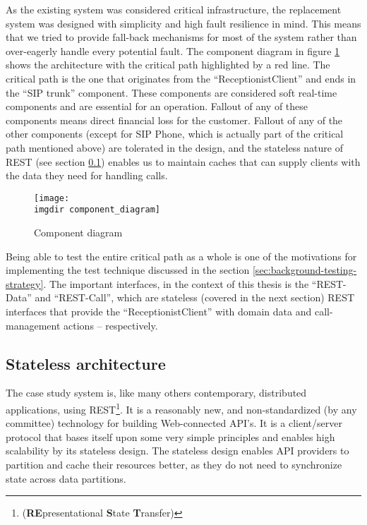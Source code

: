 \noindent
As the existing system was considered critical infrastructure, the replacement system was designed with simplicity and high fault resilience in mind. This means that we tried to provide fall-back mechanisms for most of the system rather than over-eagerly handle every potential fault. The component diagram in figure \ref{fig:component_diagram} shows the architecture with the critical path highlighted by a red line. The critical path is the one that originates from the ``ReceptionistClient'' and ends in the ``SIP trunk'' component. These components are considered soft real-time components and are essential for an operation. Fallout of any of these components means direct financial loss for the customer. Fallout of any of the other components (except for SIP Phone, which is actually part of the critical path mentioned above) are tolerated in the design, and the stateless nature of REST (see section \ref{sec:rest}) enables us to maintain caches that can supply clients with the data they need for handling calls.\medskip

\begin{figure}[ht]
\centering
\texttt{[image: \\imgdir component\_diagram]}
\caption{Component diagram}
\label{fig:component_diagram}
\end{figure}

\noindent Being able to test the entire critical path as a whole is one of the motivations for implementing the test technique discussed in the section \ref{sec:background-testing-strategy}. The important interfaces, in the context of this thesis is the ``REST-Data'' and ``REST-Call'', which are stateless (covered in the next section) REST interfaces that provide the ``ReceptionistClient'' with domain data and call-management actions -- respectively.

\subsection{Stateless architecture}
\label{sec:rest}
The case study system is, like many others contemporary, distributed applications, using REST\footnote{(\textbf{RE}presentational \textbf{S}tate \textbf{T}ransfer)}. It is a reasonably new, and non-standardized (by any committee) technology for building Web-connected API's. It is a client/server protocol that bases itself upon some very simple principles and enables high scalability by its stateless design. The stateless design enables API providers to partition and cache their resources better, as they do not need to synchronize state across data partitions.\smallskip

